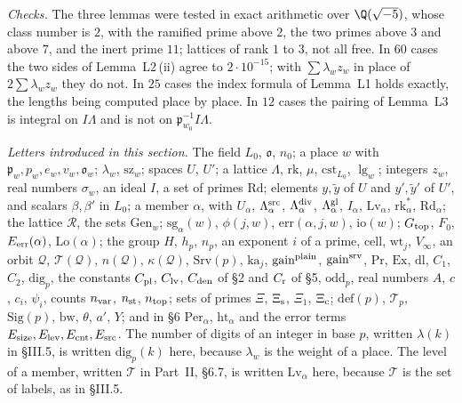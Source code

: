 \documentclass[11pt,letterpaper]{article}
\begin{document}
\emph{Checks.} The three lemmas were tested in exact arithmetic over $\Q(\sqrt{-5})$, whose class number
is $2$, with the ramified prime above $2$, the two primes above $3$ and above $7$, and the inert prime
$11$; lattices of rank $1$ to $3$, not all free. In $60$ cases the two sides of Lemma~L2\,(ii) agree to
$2\cdot10^{-15}$; with $\sum\lambda_wz_w$ in place of $2\sum\lambda_wz_w$ they do not. In $25$ cases the
index formula of Lemma~L1 holds exactly, the lengths being computed place by place. In $12$ cases the
pairing of Lemma~L3 is integral on $I\Lambda$ and is not on $\mathfrak p_{w_0}^{-1}I\Lambda$.

\emph{Letters introduced in this section.} The field $L_0$, $\mathfrak o$, $n_0$; a place $w$ with
$\mathfrak p_w,p_w,e_w,v_w,\mathfrak o_w$; $\lambda_w$, $\mathrm{sz}_w$; spaces $U$, $U'$; a lattice
$\Lambda$, $\mathrm{rk}$, $\mu$, $\mathrm{cst}_{L_0}$, $\lg_w$; integers $z_w$, real numbers $\sigma_w$, an
ideal $I$, a set of primes $\mathrm{Rd}$; elements $y,\tilde y$ of $U$ and $y',\tilde y'$ of $U'$, and
scalars $\beta,\beta'$ in $L_0$; a member $\alpha$, with $U_\alpha$, $\Lambda^{\rm src}_\alpha$,
$\Lambda^{\rm div}_\alpha$, $\Lambda^{\rm gl}_\alpha$, $I_\alpha$, $\mathrm{Lv}_\alpha$,
$\mathrm{rk}^*_\alpha$, $\mathrm{Rd}_\alpha$; the lattice $\mathcal R$, the sets $\mathrm{Gen}_w$;
$\mathrm{sg}_\alpha(w)$, $\phi(j,w)$, $\mathrm{err}(\alpha,j,w)$, $\mathrm{io}(w)$; $G_{\rm top}$, $F_0$,
$E_{\rm err}(\alpha)$, $\mathrm{Lo}(\alpha)$; the group $H$, $h_p$, $n_p$, an exponent $i$ of a prime,
$\mathrm{cell}$, $\mathrm{wt}_j$, $V_\infty$, an orbit $\mathcal Q$, $\mathcal T(\mathcal Q)$,
$n(\mathcal Q)$, $\kappa(\mathcal Q)$, $\mathrm{Srv}(p)$, $\mathrm{ka}_j$, $\mathrm{gain}^{\rm plain}$,
$\mathrm{gain}^{\rm srv}$, $\mathrm{Pr}$, $\mathrm{Ex}$, $\mathrm{dl}$, $C_1$, $C_2$, $\mathrm{dig}_p$,
the constants $C_{\rm pl}$, $C_{\rm lv}$, $C_{\rm den}$ of \S2 and $C_{\rm r}$ of \S5,
$\mathrm{odd}_p$, real numbers $A$, $c$, $c_i$, $\psi_i$, counts $n_{\rm var}$, $n_{\rm st}$, $n_{\rm top}$; sets of primes $\Xi$, $\Xi_{\rm s}$, $\Xi_1$, $\Xi_{\rm c}$; $\mathrm{def}(p)$,
$\mathcal T_p$, $\mathrm{Sig}(p)$, $\mathrm{bw}$, $\theta$, $a'$, $Y$; and in \S6 $\mathrm{Per}_\alpha$,
$\mathrm{ht}_\alpha$ and the error terms $E_{\rm size},E_{\rm lev},E_{\rm cnt},E_{\rm src}$. The number of
digits of an integer in base $p$, written $\lambda(k)$ in \S III.5, is written $\mathrm{dig}_p(k)$ here,
because $\lambda_w$ is the weight of a place. The level of a member, written $\mathcal T$ in Part~II,
\S6.7, is written $\mathrm{Lv}_\alpha$ here, because $\mathcal T$ is the set of labels, as in \S III.5.
\end{document}
